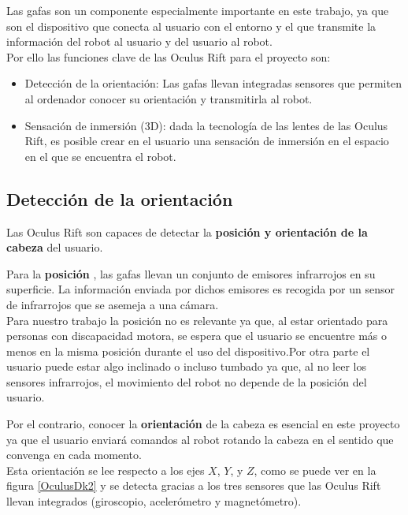 \documentclass[twoside, 11pt]{epstfg}
\begin{document}

Las gafas son un componente especialmente importante en este trabajo, ya que son el dispositivo que conecta al usuario con el entorno y el que transmite la información del robot al usuario y del usuario al robot.\\
Por ello las funciones clave de las Oculus Rift para el proyecto son:
\begin{itemize}
	\item Detección de la orientación: Las gafas llevan integradas sensores que permiten al ordenador conocer su orientación y transmitirla al robot.
	\item Sensación de inmersión (3D): dada la tecnología de las lentes de las Oculus Rift, es posible crear en el usuario una sensación de inmersión en el espacio en el que se encuentra el robot.
\end{itemize}

\subsection{Detección de la orientación}


Las Oculus Rift son capaces de detectar la \textbf{posición y orientación de la cabeza} del usuario.

Para la \textbf{posición} , las gafas llevan un conjunto de emisores infrarrojos en su superficie. La información enviada por dichos emisores es recogida por un sensor de infrarrojos que se asemeja a una cámara.\\
Para nuestro trabajo la posición no es relevante ya que, al estar orientado para personas con discapacidad motora,  se espera que el usuario se encuentre más o menos en la misma posición durante el uso del dispositivo.Por otra parte el usuario puede estar algo inclinado o incluso tumbado ya que, al no leer los sensores infrarrojos, el movimiento del robot no depende de la posición del usuario.


Por el contrario, conocer la \textbf{orientación} de la cabeza es esencial en este proyecto ya que el usuario enviará comandos al robot rotando la cabeza en el sentido que convenga en cada momento.\\Esta orientación se lee respecto a los ejes $X$, $Y$, y $Z$, como se puede ver en la figura \ref{OculusDk2}  y se detecta gracias a los tres sensores que las Oculus Rift llevan integrados (giroscopio, acelerómetro y magnetómetro).
\end{document}
